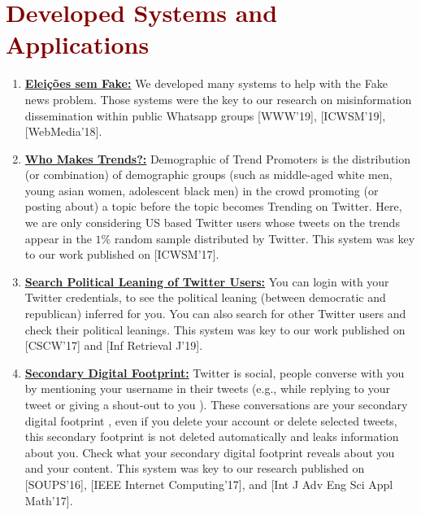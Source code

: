 \section*{\textcolor{maroon}{\normalsize Developed Systems and Applications}} 

\begin{enumerate}

\item \textbf{\href{https://www.eleicoessemfake.dcc.ufmg.br}{Eleições sem Fake:}} We developed many systems to help with the Fake news problem. Those systems were the key to our research on misinformation dissemination within public Whatsapp groups [WWW'19], [ICWSM'19], [WebMedia'18].
\item \textbf{\href{https://twitter-app.mpi-sws.org/who-makes-trends/}{Who Makes Trends?:}} Demographic of Trend Promoters is the distribution (or combination) of demographic groups (such as middle-aged white men, young asian women, adolescent black men) in the crowd promoting (or posting about) a topic before the topic becomes Trending on Twitter. Here, we are only considering US based Twitter users whose tweets on the trends appear in the $1\%$ random sample distributed by Twitter. This system was key to our work published on [ICWSM'17].
\item \textbf{\href{http://twitter-app.mpi-sws.org/search-political-bias-of-users/}{Search Political Leaning of Twitter Users:}} You can login with your Twitter credentials, to see the political leaning (between democratic and republican) inferred for you. You can also search for other Twitter users and check their political leanings. This system was key to our work published on [CSCW'17] and [Inf Retrieval J'19].
\item \textbf{\href{http://twitter-app.mpi-sws.org/footprint/}{Secondary Digital Footprint:}} Twitter is social, people converse with you by mentioning your username in their tweets (e.g., while replying to your tweet or giving a shout-out to you ). These conversations are your secondary digital footprint , even if you delete your account or delete selected tweets, this secondary footprint is not deleted automatically and leaks information about you. Check what your secondary digital footprint reveals about you and your content. This system was key to our research published on [SOUPS'16], [IEEE Internet Computing'17], and [Int J Adv Eng Sci Appl Math'17].

\end{enumerate}


